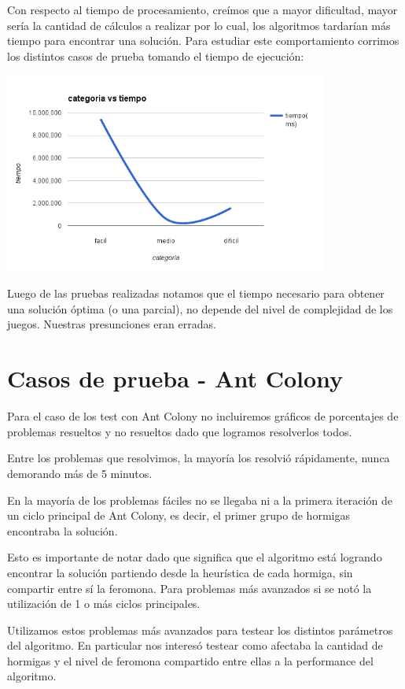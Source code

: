 \documentclass[a4paper,spanish]{article}
\begin{document}
Con respecto al tiempo de procesamiento, creímos que a mayor dificultad, mayor sería la
cantidad de cálculos a realizar por lo cual, los algoritmos tardarían más tiempo para encontrar
una solución. Para estudiar este comportamiento corrimos los distintos casos de prueba tomando
el tiempo de ejecución:

\begin{center}
	\includegraphics[width=0.8\textwidth]{./graficos/categoriaVsTiempo.png}
\end{center}

Luego de las pruebas realizadas notamos que el tiempo necesario para obtener una solución
óptima (o una parcial), no depende del nivel de complejidad de los juegos.
Nuestras presunciones eran erradas.

\section{Casos de prueba - Ant Colony}

Para el caso de los test con Ant Colony no incluiremos gráficos de porcentajes de problemas resueltos y
no resueltos dado que logramos resolverlos todos.

Entre los problemas que resolvimos, la mayoría los resolvió rápidamente, nunca demorando más de 5 minutos.

En la mayoría de los problemas fáciles no se llegaba ni a la primera iteración de un ciclo
principal de Ant Colony, es decir, el primer grupo de hormigas encontraba la solución.

Esto es importante de notar dado que significa que el algoritmo está logrando encontrar la solución 
partiendo desde la heurística de cada hormiga, sin compartir entre sí la feromona.
Para problemas más avanzados si se notó la utilización de 1 o más ciclos principales.

Utilizamos estos problemas más avanzados para testear los distintos parámetros del algoritmo. En particular
nos interesó testear como afectaba la cantidad de hormigas y el nivel de feromona compartido entre ellas
a la performance del algoritmo.
\end{document}
